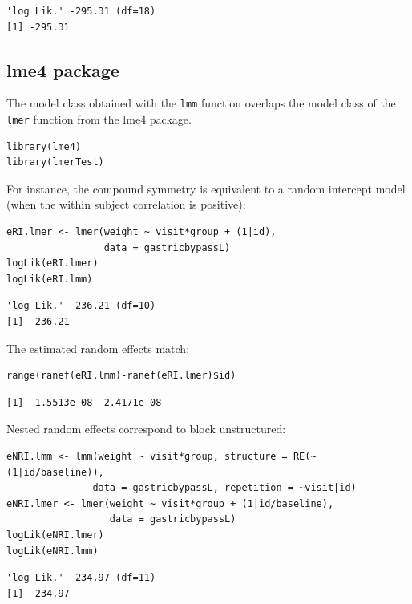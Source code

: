 \documentclass[12pt]{article}
\begin{document}
\begin{verbatim}
'log Lik.' -295.31 (df=18)
[1] -295.31
\end{verbatim}


\clearpage

\subsection{lme4 package}
\label{sec:org818c0f2}

The model class obtained with the \texttt{lmm} function overlaps the model
class of the \texttt{lmer} function from the lme4 package.
\lstset{language=r,label= ,caption= ,captionpos=b,numbers=none}
\begin{lstlisting}
library(lme4)
library(lmerTest)
\end{lstlisting}

For instance, the compound symmetry is equivalent to a random
intercept model (when the within subject correlation is positive):
\lstset{language=r,label= ,caption= ,captionpos=b,numbers=none}
\begin{lstlisting}
eRI.lmer <- lmer(weight ~ visit*group + (1|id),
                 data = gastricbypassL)
logLik(eRI.lmer)
logLik(eRI.lmm)
\end{lstlisting}

\begin{verbatim}
'log Lik.' -236.21 (df=10)
[1] -236.21
\end{verbatim}


The estimated random effects match:
\lstset{language=r,label= ,caption= ,captionpos=b,numbers=none}
\begin{lstlisting}
range(ranef(eRI.lmm)-ranef(eRI.lmer)$id)
\end{lstlisting}

\begin{verbatim}
[1] -1.5513e-08  2.4171e-08
\end{verbatim}


Nested random effects correspond to block unstructured:
\lstset{language=r,label= ,caption= ,captionpos=b,numbers=none}
\begin{lstlisting}
eNRI.lmm <- lmm(weight ~ visit*group, structure = RE(~(1|id/baseline)),
               data = gastricbypassL, repetition = ~visit|id)
eNRI.lmer <- lmer(weight ~ visit*group + (1|id/baseline),
                  data = gastricbypassL)
logLik(eNRI.lmer)
logLik(eNRI.lmm)
\end{lstlisting}

\begin{verbatim}
'log Lik.' -234.97 (df=11)
[1] -234.97
\end{verbatim}
\end{document}
